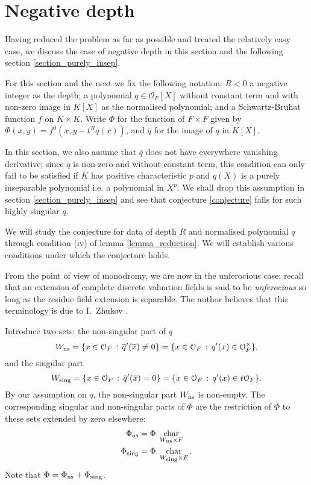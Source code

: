 \documentclass{lmsMODIFIED}
\newcommand{\roi}{\mathcal{O}}
\newcommand{\res}[1]{\overline{#1}}
\newcommand{\mult}[1]{#1^{\times}}
\newcommand{\sub}[1]{{\mbox{\scriptsize {#1}}}}
\DeclareMathOperator{\Char}{char}
\begin{document}

\section{Negative depth}\label{section_negative_depth}
Having reduced the problem as far as possible and treated the relatively easy case, we discuss the case of negative depth in this section and the following section \ref{section_purely_insep}.

For this section and the next we fix the following notation: $R<0$ a negative integer as the depth; a polynomial $q\in\roi_{F}[X]$ without constant term and with non-zero image in $ K [X]$ as the normalised polynomial; and a Schwartz-Bruhat function $f$ on $K\times K$. Write $\Phi$ for the function of $F\times F$ given by $\Phi(x,y)=f^0(x,y-t^Rq(x))$, and $\res{q}$ for the image of $q$ in $ K [X]$.

In this section, we also assume that $\res{q}$ does not have everywhere vanishing derivative; since $\res{q}$ is non-zero and without constant term, this condition can only fail to be satisfied if $ K $ has positive characteristic $p$ and $q(X)$ is a purely inseparable polynomial i.e. a polynomial in $X^p$. We shall drop this assumption in section \ref{section_purely_insep} and see that conjecture \ref{conjecture} fails for such highly singular $q$.

We will study the conjecture for data of depth $R$ and normalised polynomial $q$ through condition (iv) of lemma \ref{lemma_reduction}. We will establish various conditions under which the conjecture holds.

\begin{remark}\label{remark_unferocious_case}
From the point of view of monodromy, we are now in the unferocious case; recall that an extension of complete discrete valuation fields is said to be {\em unferocious} so long as the residue field extension is separable. The author believes that this terminology is due to I.~Zhukov \cite{Zhukov2000}.
\end{remark}

Introduce two sets: the non-singular part of $q$ \[W_\sub{ns}=\{x\in\roi_{F}\,:\,\res{q}'(\res{x})\neq 0\}=\{x\in\roi_{F}\,:\,q'(x)\in \mult{\roi_{F}}\},\] and the singular part \[W_\sub{sing}=\{x\in\roi_{F}\,:\,\res{q}'(\res{x})=0\}=\{x\in\roi_{F}\,:\,q'(x)\in t\roi_{F}\}.\] By our assumption on $q$, the non-singular part $W_\sub{ns}$ is non-empty. The corresponding singular and non-singular parts of $\Phi$ are the restriction of $\Phi$ to these sets extended by zero elsewhere: \begin{align*} \Phi_\sub{ns}&=\Phi\;\Char_{W_\sub{ns}\times F}\\ \Phi_\sub{sing}&=\Phi\;\Char_{W_\sub{sing}\times F}.\end{align*} Note that $\Phi=\Phi_\sub{ns}+\Phi_\sub{sing}$.
\end{document}
